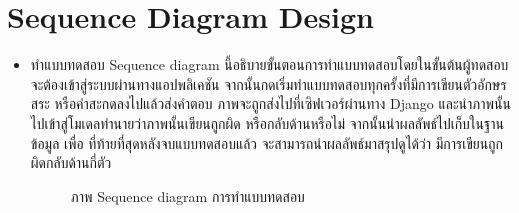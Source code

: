 \documentclass[12pt,oneside,openright,a4paper]{cpe-thai-project}
\begin{document}
\section{Sequence Diagram Design}
   \begin{itemize}
    \item ทำแบบทดสอบ 
    Sequence diagram นี้อธิบายขั้นตอนการทำแบบทดสอบโดยในขั้นต้นผู้ทดสอบจะต้องเข้าสู่ระบบผ่านทางแอปพลิเคชัน 
    จากนั้นกดเริ่มทำแบบทดสอบทุกครั้งที่มีการเขียนตัวอักษร สระ หรือคำสะกดลงไปแล้วส่งคำตอบ ภาพจะถูกส่งไปที่เซิฟเวอร์ผ่านทาง Django
     และนำภาพนั้นไปเข้าสู่โมเดลทำนายว่าภาพนั้นเขียนถูกผิด หรือกลับด้านหรือไม่ จากนั้นนำผลลัพธ์ไปเก็บในฐานข้อมูล เพื่อ ที่ท้ายที่สุดหลังจบแบบทดสอบแล้ว 
     จะสามารถนำผลลัพธ์มาสรุปดูได้ว่า มีการเขียนถูกผิดกลับด้านกี่ตัว 
    \begin{figure}[!ht]\centering
      \setlength{\fboxrule}{0.2mm} %
      \setlength{\fboxsep}{1cm}
      \caption{ภาพ Sequence diagram การทำแบบทดสอบ}\label{fig:activity1}
     \end{figure}
     \newpage
     \begin{table}[!h]\centering

\end{table}
\end{itemize}
\end{document}
